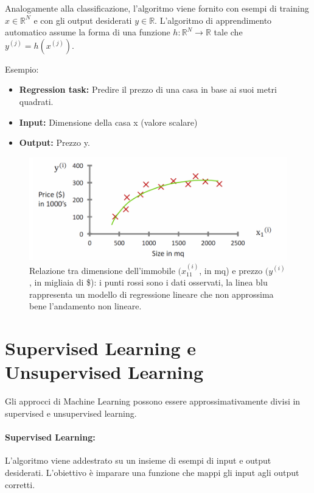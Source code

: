 \noindent
Analogamente alla classificazione, l'algoritmo viene fornito con esempi di training $x \in \mathbb{R}^{N}$ e con gli output desiderati $y \in \mathbb{R}$. L'algoritmo di apprendimento automatico assume la forma di una funzione $ h: \mathbb{R}^{N} \rightarrow \mathbb{R}$ tale che $y^{(j)} = h(x^{(j)})$.

\noindent
Esempio:

\begin{itemize}
    \item \textbf{Regression task:} Predire il prezzo di una casa in base ai suoi metri quadrati.
    \item \textbf{Input:} Dimensione della casa x (valore scalare)
    \item \textbf{Output:} Prezzo y.
\end{itemize}

\begin{figure}
    \centering
    \includegraphics[width=\textwidth]{images/regression.png}
    \caption{Relazione tra dimensione dell’immobile $(x_11^{(i)}$, in mq) e prezzo $(y^{(i)}$, in migliaia di \$): i punti rossi sono i dati osservati, la linea blu rappresenta un modello di regressione lineare che non approssima bene l’andamento non lineare.}
    \label{fig:regressione}
\end{figure}

\section{Supervised Learning e Unsupervised Learning}

Gli approcci di Machine Learning possono essere approssimativamente divisi in supervised e unsupervised learning.

\paragraph{Supervised Learning:} L'algoritmo viene addestrato su un insieme di esempi di input e output desiderati. L'obiettivo è imparare una funzione che mappi gli input agli output corretti.


